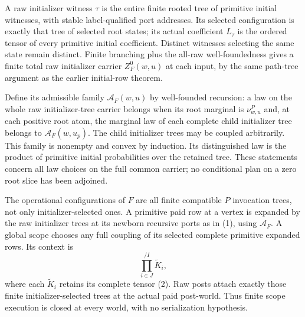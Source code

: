 \documentclass[11pt]{article}
\begin{document}
A raw initializer witness $\tau$ is the entire finite rooted tree of primitive initial witnesses, with stable label-qualified port addresses. Its selected configuration is exactly that tree of selected root states; its actual coefficient $L_\tau$ is the ordered tensor of every primitive initial coefficient. Distinct witnesses selecting the same state remain distinct. Finite branching plus the all-raw well-foundedness gives a finite total raw initializer carrier $Z_F^0(w,u)$ at each input, by the same path-tree argument as the earlier initial-row theorem.

Define its admissible family $\mathcal A_F(w,u)$ by well-founded recursion: a law on the whole raw initializer-tree carrier belongs when its root marginal is $\nu^P_{w,u}$ and, at each positive root atom, the marginal law of each complete child initializer tree belongs to $\mathcal A_F(w,u_p)$. The child initializer trees may be coupled arbitrarily. This family is nonempty and convex by induction. Its distinguished law is the product of primitive initial probabilities over the retained tree. These statements concern all law choices on the full common carrier; no conditional plan on a zero root slice has been adjoined.

The operational configurations of $F$ are all finite compatible $P$ invocation trees, not only initializer-selected ones. A primitive paid row at a vertex is expanded by the raw initializer trees at its newborn recursive ports as in (1), using $\mathcal A_F$. A global scope chooses any full coupling of its selected complete primitive expanded rows. Its context is
\[
             \prod_{i\in J}^{/I}\widetilde K_i,              \tag{3}
\]
where each $\widetilde K_i$ retains its complete tensor (2). Raw posts attach exactly those finite initializer-selected trees at the actual paid post-world. Thus finite scope execution is closed at every world, with no serialization hypothesis.
\end{document}
